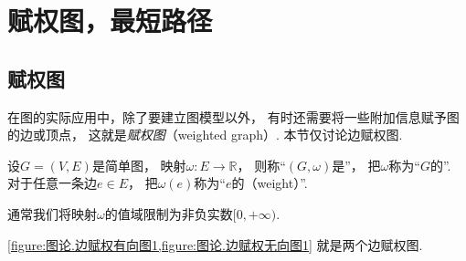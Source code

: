 \section{赋权图，最短路径}
\subsection{赋权图}
在图的实际应用中，除了要建立图模型以外，
有时还需要将一些附加信息赋予图的边或顶点，
这就是\emph{赋权图}（weighted graph）.
本节仅讨论边赋权图.

\begin{definition}
设\(G = (V,E)\)是简单图，
映射\(\omega\colon E \to \mathbb{R}\)，
则称“\((G,\omega)\)是”，
把\(\omega\)称为“\(G\)的”.
对于任意一条边\(e \in E\)，
把\(\omega(e)\)称为“\(e\)的（weight）”.
\end{definition}

通常我们将映射\(\omega\)的值域限制为非负实数\([0,+\infty)\).

\cref{figure:图论.边赋权有向图1,figure:图论.边赋权无向图1} 就是两个边赋权图.

